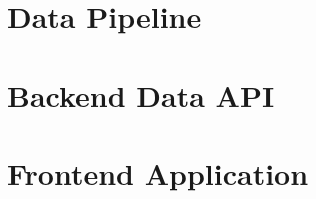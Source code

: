 
\section{Data Pipeline}
\label{sec:impl:pipeline}

\section{Backend Data API}
\label{sec:impl:backend}

\section{Frontend Application}
\label{sec:impl:frontend}
